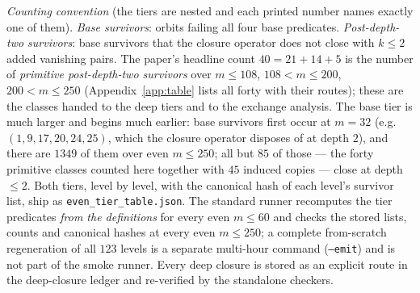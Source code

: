 \documentclass[11pt]{amsart}
\theoremstyle{remark}
\begin{document}
\emph{Counting convention} (the tiers are nested and each printed number names exactly one of
them). \emph{Base survivors}: orbits failing all four base predicates. \emph{Post-depth-two
survivors}: base survivors that the closure operator does not close with $k\le2$ added vanishing
pairs. The paper's headline count $40=21+14+5$ is the number of \emph{primitive post-depth-two
survivors} over $m\le108$, $108<m\le200$, $200<m\le250$ (Appendix~\ref{app:table} lists all
forty with their routes); these are the classes handed to the
deep tiers and to the exchange analysis. The base tier is much larger and begins much earlier:
base survivors first occur at $m=32$ (e.g.\ $(1,9,17,20,24,25)$, which the closure operator
disposes of at depth $2$), and there are $1349$ of them over even $m\le250$; all but $85$ of
those --- the forty primitive classes counted here together with $45$ induced copies --- close at
depth $\le2$. Both tiers, level by level, with the canonical hash of each level's
survivor list, ship as \texttt{even\_tier\_table.json}. The standard runner recomputes the tier
predicates \emph{from the definitions} for every even $m\le60$ and checks the stored lists,
counts and canonical hashes at every even $m\le250$; a complete from-scratch regeneration of all
$123$ levels is a separate multi-hour command (\texttt{--emit}) and is not part of the smoke
runner. Every deep closure is stored as an
explicit route in the deep-closure ledger and re-verified by the standalone checkers.
\end{document}
